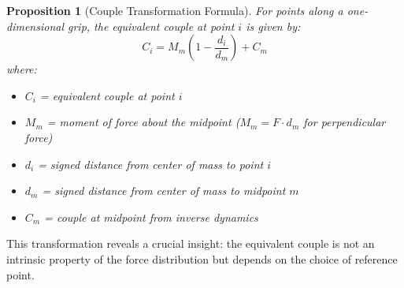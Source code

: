 \documentclass[11pt,a4paper]{article}
\theoremstyle{definition}
\theoremstyle{plain}
\newtheorem{proposition}{Proposition}[section]
\begin{document}
\begin{proposition}[Couple Transformation Formula]
For points along a one-dimensional grip, the equivalent couple at point $i$ is given by:
\begin{equation}
\label{eq:couple_transform}
C_i = M_m \left(1 - \frac{d_i}{d_m}\right) + C_m
\end{equation}
where:
\begin{itemize}
    \item $C_i$ = equivalent couple at point $i$
    \item $M_m$ = moment of force about the midpoint ($M_m = F \cdot d_m$ for perpendicular force)
    \item $d_i$ = signed distance from center of mass to point $i$
    \item $d_m$ = signed distance from center of mass to midpoint $m$
    \item $C_m$ = couple at midpoint from inverse dynamics
\end{itemize}
\end{proposition}

This transformation reveals a crucial insight: the equivalent couple is not an intrinsic property of the force distribution but depends on the choice of reference point.
\end{document}
